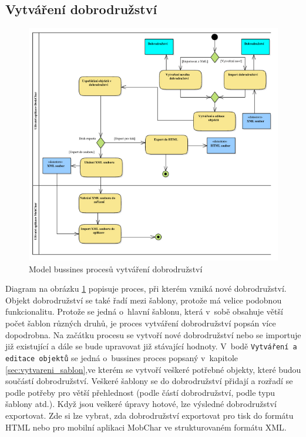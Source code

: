 \documentclass[thesis=B,czech]{resources/FITthesis}[2012/06/26]
\begin{document}
\subsection{Vytváření dobrodružství}
\begin{figure}\centering
	\includegraphics[width=1\textwidth]{images/business_dobrodruzstvi}
	\caption[Business proces vytváření dobrodružství]{Model bussines procesů vytváření dobrodružství}\label{fig:bp_dobrodruzsvi}
\end{figure}
Diagram na obrázku \ref{fig:bp_dobrodruzsvi} popisuje proces, při kterém vzniká nové dobrodružství. Objekt dobrodružství se také řadí mezi šablony, protože má velice podobnou funkcionalitu. Protože se jedná o~hlavní šablonu, která v~sobě obsahuje větší počet šablon různých druhů, je proces vytváření dobrodružství popsán více dopodrobna. Na začátku procesu se vytvoří nové dobrodružství nebo se importuje již existující a dále se bude upravovat již stávající hodnoty. V~bodě \texttt{Vytváření a editace objektů} se jedná o~bussines proces popsaný v~kapitole \ref{sec:vytvareni_sablon},ve kterém se vytvoří veškeré potřebné objekty, které budou součástí dobrodružství. Veškeré šablony se do dobrodružství přidají a rozřadí se podle potřeby pro větší přehlednost (podle částí dobrodružství, podle typu šablony atd.). Když jsou veškeré úpravy hotové, lze výsledné dobrodružství exportovat. Zde si lze vybrat, zda dobrodružství exportovat pro tisk do formátu HTML nebo pro mobilní aplikaci MobChar ve strukturovaném formátu XML.
\end{document}
